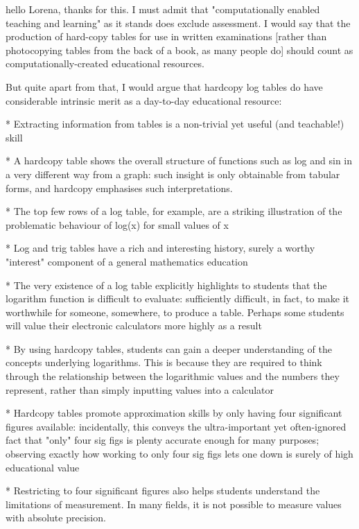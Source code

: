 hello Lorena, thanks for this. I must admit that "computationally
enabled teaching and learning" as it stands does exclude assessment. I
would say that the production of hard-copy tables for use in written
examinations [rather than photocopying tables from the back of a book,
as many people do] should count as computationally-created educational
resources.

But quite apart from that, I would argue that hardcopy log tables do
have considerable intrinsic merit as a day-to-day educational
resource:

* Extracting information from tables is a non-trivial yet useful (and
teachable!) skill

* A hardcopy table shows the overall structure of functions such as
log and sin in a very different way from a graph: such insight is only
obtainable from tabular forms, and hardcopy emphasises such
interpretations.

* The top few rows of a log table, for
example, are a striking illustration of the problematic behaviour of log(x)
for small values of x

* Log and trig tables have a rich and interesting
history, surely a worthy "interest" component of a general mathematics
education

* The very existence of a log table explicitly highlights to
students that the logarithm function is difficult to evaluate:
sufficiently difficult, in fact, to make it worthwhile for someone,
somewhere, to produce a table. Perhaps some students will value their
electronic calculators more highly as a result

* By using hardcopy tables, students can gain a deeper understanding of
the concepts underlying logarithms. This is because they are required
to think through the relationship between the logarithmic values and
the numbers they represent, rather than simply inputting values into a
calculator

* Hardcopy tables promote approximation skills by only having four
significant figures available: incidentally, this conveys the
ultra-important yet often-ignored fact that "only" four sig figs is
plenty accurate enough for many purposes; observing exactly how
working to only four sig figs lets one down is surely of high
educational value

* Restricting to four significant figures also helps students
understand the limitations of measurement.  In many fields, it is not
possible to measure values with absolute precision.

